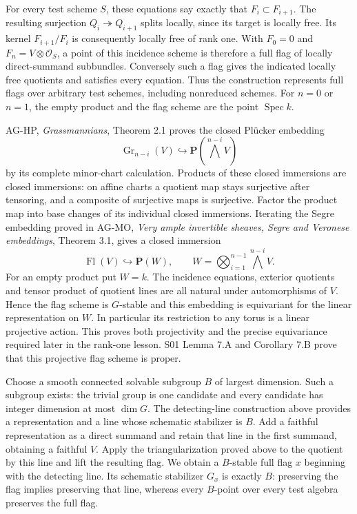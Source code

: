 \documentclass[11pt,a4paper,openany]{report}
\begin{document}
For every test scheme \(S\), these equations say exactly that \(F_i\subset F_{i+1}\). The resulting surjection \(Q_i\twoheadrightarrow Q_{i+1}\) splits locally, since its target is locally free. Its kernel \(F_{i+1}/F_i\) is consequently locally free of rank one. With \(F_0=0\) and \(F_n=V\otimes\mathcal O_S\), a point of this incidence scheme is therefore a full flag of locally direct-summand subbundles. Conversely such a flag gives the indicated locally free quotients and satisfies every equation. Thus the construction represents full flags over arbitrary test schemes, including nonreduced schemes. For \(n=0\) or \(n=1\), the empty product and the flag scheme are the point \(\operatorname{Spec}k\).

AG-HP, \emph{Grassmannians}, Theorem 2.1 proves the closed Plücker embedding \[
 \operatorname{Gr}_{n-i}(V)\hookrightarrow
                       \mathbf P(\bigwedge^{n-i}V)
\] by its complete minor-chart calculation. Products of these closed immersions are closed immersions: on affine charts a quotient map stays surjective after tensoring, and a composite of surjective maps is surjective. Factor the product map into base changes of its individual closed immersions. Iterating the Segre embedding proved in AG-MO, \emph{Very ample invertible sheaves, Segre and Veronese embeddings}, Theorem 3.1, gives a closed immersion \[
 \operatorname{Fl}(V)\hookrightarrow\mathbf P(W),\qquad
 W=\bigotimes_{i=1}^{n-1}\bigwedge^{n-i}V.
\] For an empty product put \(W=k\). The incidence equations, exterior quotients and tensor product of quotient lines are all natural under automorphisms of \(V\). Hence the flag scheme is \(G\)-stable and this embedding is equivariant for the linear representation on \(W\). In particular its restriction to any torus is a linear projective action. This proves both projectivity and the precise equivariance required later in the rank-one lesson. S01 Lemma 7.A and Corollary 7.B prove that this projective flag scheme is proper.

Choose a smooth connected solvable subgroup \(B\) of largest dimension. Such a subgroup exists: the trivial group is one candidate and every candidate has integer dimension at most \(\dim G\). The detecting-line construction above provides a representation and a line whose schematic stabilizer is \(B\). Add a faithful representation as a direct summand and retain that line in the first summand, obtaining a faithful \(V\). Apply the triangularization proved above to the quotient by this line and lift the resulting flag. We obtain a \(B\)-stable full flag \(x\) beginning with the detecting line. Its schematic stabilizer \(G_x\) is exactly \(B\): preserving the flag implies preserving that line, whereas every \(B\)-point over every test algebra preserves the full flag.
\end{document}
